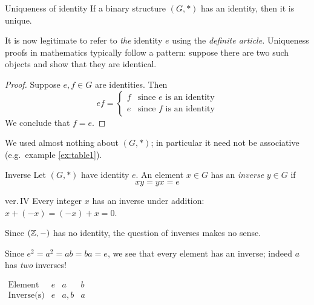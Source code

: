 \begin{lemm}{Uniqueness of identity}{}
If a binary structure $(G,\ast)$ has an identity, then it is unique.
\end{lemm}

It is now legitimate to refer to \emph{the} identity $e$ using the \emph{definite article.} Uniqueness proofs in mathematics typically follow a pattern: suppose there are two such objects and show that they are identical.

\begin{proof}
Suppose $e,f\in G$ are identities. Then
\[ef=\begin{cases}
	f&\text{since $e$ is an identity}\\
	e&\text{since $f$ is an identity}
\end{cases}\]
We conclude that $f=e$.
\end{proof}

We used almost nothing about $(G,*)$; in particular it need not be associative (e.g.\ example \ref{ex:table1}).

\begin{defn}{Inverse}{}
Let $(G,*)$ have identity $e$. An element $x\in G$ has an \emph{inverse} $y\in G$ if
\[xy=yx=e\]
\end{defn}

\begin{examples*}{ver.\,IV}{}
\exstart Every integer $x$ has an inverse under addition: $x+(-x)=(-x)+x=0$.\vspace{0pt}
\begin{enumerate}\setcounter{enumi}{1}\itemsep2pt
  \item Since $(\mathbb{Z},-)$ has no identity, the question of inverses makes no sense.
  
  \begin{minipage}[t]{0.7\linewidth}\vspace{-2pt}
  \item Since $e^2=a^2=ab=ba=e$, we see that every element has an inverse; indeed $a$ has \emph{two} inverses!
  \end{minipage}\begin{minipage}[t]{0.3\linewidth}\vspace{-2pt}
  \flushright $\begin{array}{l||c|c|c}
  \text{Element}&e&a&b\\\hline
  \text{Inverse(s)}&e&a,b&a
  \end{array}$
  \end{minipage}
\end{enumerate}
\end{examples*}



